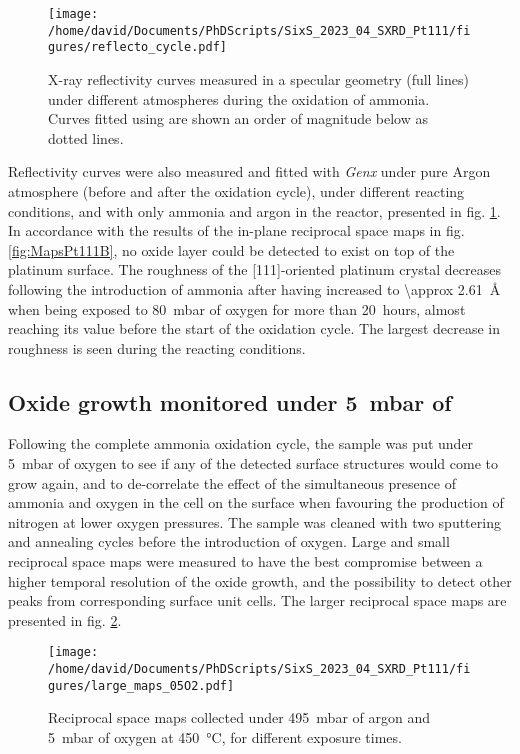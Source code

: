 \begin{figure}[!htb]
    \centering
    \texttt{[image: /home/david/Documents/PhDScripts/SixS\_2023\_04\_SXRD\_Pt111/figures/reflecto\_cycle.pdf]}
    \caption{
    	X-ray reflectivity curves measured in a specular geometry (full lines) under different atmospheres during the oxidation of ammonia.
    	Curves fitted using  are shown an order of magnitude below as dotted lines.
    }
    \label{fig:ReflectoCycle}
\end{figure}

Reflectivity curves were also measured and fitted with \textit{Genx} under pure Argon atmosphere (before and after the oxidation cycle), under different reacting conditions, and with only ammonia and argon in the reactor, presented in fig. \ref{fig:ReflectoCycle}.
In accordance with the results of the in-plane reciprocal space maps in fig. \ref{fig:MapsPt111B}, no oxide layer could be detected to exist on top of the platinum surface.
The roughness of the [111]-oriented platinum crystal decreases following the introduction of ammonia after having increased to \qty{\approx 2.61}{\angstrom} when being exposed to \qty{80}{\milli\bar} of oxygen for more than \qty{20}{hours}, almost reaching its value before the start of the oxidation cycle.
The largest decrease in roughness is seen during the reacting conditions.

\subsection{Oxide growth monitored under \qty{5}{\milli\bar} of }

Following the complete ammonia oxidation cycle, the sample was put under \qty{5}{\milli\bar} of oxygen to see if any of the detected surface structures would come to grow again, and to de-correlate the effect of the simultaneous presence of ammonia and oxygen in the cell on the surface when favouring the production of nitrogen at lower oxygen pressures.
The sample was cleaned with two sputtering and annealing cycles before the introduction of oxygen.
Large and small reciprocal space maps were measured to have the best compromise between a higher temporal resolution of the oxide growth, and the possibility to detect other peaks from corresponding surface unit cells.
The larger reciprocal space maps are presented in fig. \ref{fig:LargeMapsPt111LowOxygen}.

\begin{figure}[!htb]
    \centering
    \texttt{[image: /home/david/Documents/PhDScripts/SixS\_2023\_04\_SXRD\_Pt111/figures/large\_maps\_05O2.pdf]}
    \caption{
        Reciprocal space maps collected under \qty{495}{\milli\bar} of argon and \qty{5}{\milli\bar} of oxygen at \qty{450}{\degreeCelsius}, for different exposure times.
    }
    \label{fig:LargeMapsPt111LowOxygen}
\end{figure}

